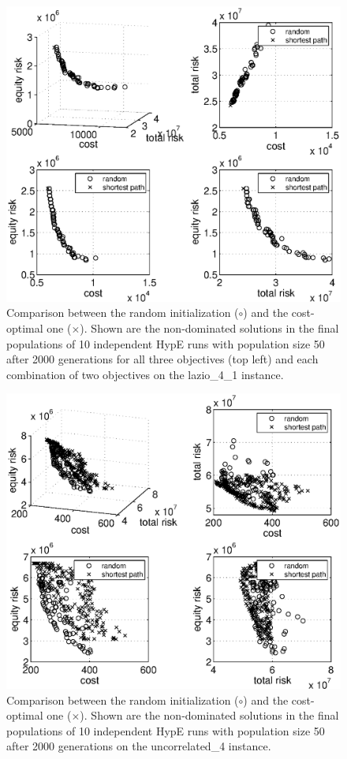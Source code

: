 \documentclass[preprint,12pt]{elsarticle}
\begin{document}
\begin{figure}
	\centering
	\includegraphics[width=0.75\columnwidth]{../experiments/randVsCost/randVsCost_ns4_1_OriginalCost_2000gens.eps}
	\vspace{-1em}
	\caption{\label{fig:allsolutions} Comparison between the random initialization ($\circ$) and the cost-optimal one ($\times$). Shown are the non-dominated solutions in the final populations of 10 independent HypE runs with population size 50 after 2000 generations for all three objectives (top left) and each combination of two objectives on the lazio\_4\_1 instance.}
\end{figure}

\begin{figure}
	\centering
	\includegraphics[width=0.75\columnwidth]{../experiments/randVsCost/randVsCost_ns4_1_New_2000gens.eps}
	\vspace{-1em}
	\caption{\label{fig:onlynondominated} Comparison between the random initialization ($\circ$) and the cost-optimal one ($\times$). Shown are the non-dominated solutions in the final populations of 10 independent HypE runs with population size 50 after 2000 generations on the uncorrelated\_4 instance.}
\end{figure}
\end{document}
